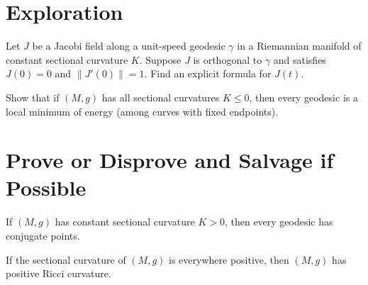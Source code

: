 \documentclass{homework}
\begin{document}
\section{Exploration}

\begin{problem}
  Let $J$ be a Jacobi field along a unit-speed geodesic $\gamma$ in a Riemannian manifold of constant sectional curvature $K$.
  Suppose $J$ is orthogonal to $\dot\gamma$ and satisfies $J(0)=0$ and $\|J'(0)\|=1$.
  Find an explicit formula for $J(t)$.
\end{problem}

\begin{problem}
  Show that if $(M,g)$ has all sectional curvatures $K \le 0$, then every geodesic is a local minimum of energy (among curves with fixed endpoints).
\end{problem}

\section{Prove or Disprove and Salvage if Possible}

\begin{problem}
  If $(M,g)$ has constant sectional curvature $K > 0$, then every geodesic has conjugate points.
\end{problem}


\begin{problem}
  If the sectional curvature of $(M,g)$ is everywhere positive, then $(M,g)$ has positive Ricci curvature.
\end{problem}
\end{document}
